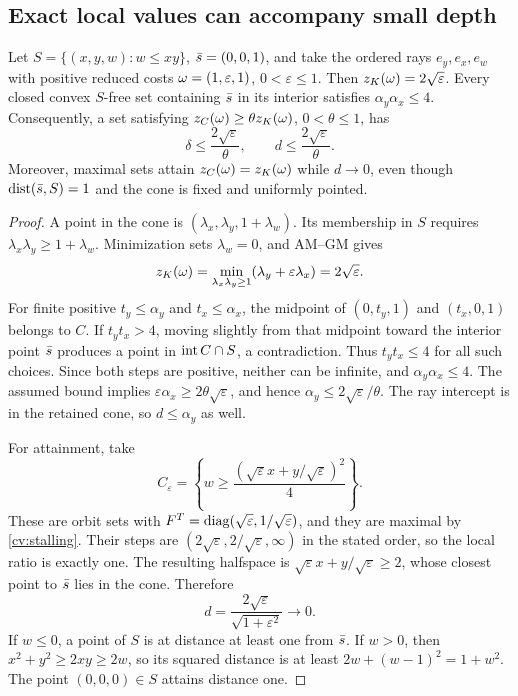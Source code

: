\subsection{Exact local values can accompany small depth}

\begin{proposition}\label{cv:shallow-optimal}
Let $S=\{(x,y,w):w\le xy\}$, $\bar s=(0,0,1)$, and take the ordered rays
$e_y,e_x,e_w$ with positive reduced costs $\omega=(1,\varepsilon,1)$,
$0<\varepsilon\le1$. Then $z_K(\omega)=2\sqrt\varepsilon$.
Every closed convex $S$-free set containing $\bar s$ in its interior
satisfies $\alpha_y\alpha_x\le4$. Consequently, a set satisfying
$z_C(\omega)\ge\theta z_K(\omega)$, $0<\theta\le1$, has
\[
 \delta\le\frac{2\sqrt\varepsilon}{\theta},\qquad
 d\le\frac{2\sqrt\varepsilon}{\theta}.
\]
Moreover, maximal sets attain $z_C(\omega)=z_K(\omega)$ while $d\to0$, even
though $\operatorname{dist}(\bar s,S)=1$ and the cone is fixed and uniformly pointed.
\end{proposition}

\begin{proof}
A point in the cone is $(\lambda_x,\lambda_y,1+\lambda_w)$.
Its membership in $S$ requires
$\lambda_x\lambda_y\ge1+\lambda_w$. Minimization sets
$\lambda_w=0$, and AM--GM gives
\[
 z_K(\omega)=\min_{\lambda_x\lambda_y\ge1}
                 (\lambda_y+\varepsilon\lambda_x)=2\sqrt\varepsilon.
\]
For finite positive $t_y\le\alpha_y$ and $t_x\le\alpha_x$, the midpoint
of $(0,t_y,1)$ and $(t_x,0,1)$ belongs to $C$. If $t_yt_x>4$, moving
slightly from that midpoint toward the interior point $\bar s$ produces a
point in $\operatorname{int} C\cap S$, a contradiction. Thus $t_yt_x\le4$ for all
such choices. Since both steps are positive, neither can be infinite,
and $\alpha_y\alpha_x\le4$. The assumed bound implies
$\varepsilon\alpha_x\ge2\theta\sqrt\varepsilon$, and hence
$\alpha_y\le2\sqrt\varepsilon/\theta$. The ray intercept is in the
retained cone, so $d\le\alpha_y$ as well.

For attainment, take
\[
 C_\varepsilon=\left\{w\ge
              \frac{(\sqrt\varepsilon x+y/\sqrt\varepsilon)^2}{4}\right\}.
\]
These are orbit sets with $F^T=\operatorname{diag}(\sqrt\varepsilon,1/\sqrt\varepsilon)$,
and they are maximal by \cref{cv:stalling}. Their steps are
$(2\sqrt\varepsilon,2/\sqrt\varepsilon,\infty)$ in the stated order,
so the local ratio is exactly one. The resulting halfspace is
$\sqrt\varepsilon x+y/\sqrt\varepsilon\ge2$, whose closest point to
$\bar s$ lies in the cone. Therefore
\[
 d=\frac{2\sqrt\varepsilon}{\sqrt{1+\varepsilon^2}}\longrightarrow0.
\]
If $w\le0$, a point of $S$ is at distance at least one from $\bar s$.
If $w>0$, then $x^2+y^2\ge2xy\ge2w$, so its squared distance is at least
$2w+(w-1)^2=1+w^2$. The point $(0,0,0)\in S$ attains distance one.
\end{proof}


